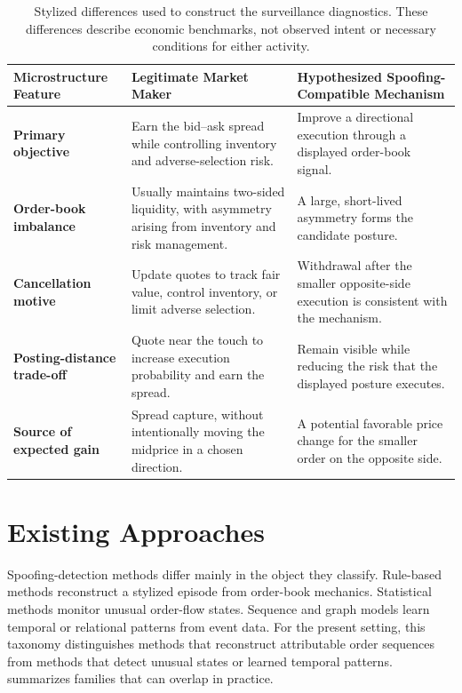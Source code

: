 \documentclass[11pt]{article}
\begin{document}
\begin{table}[htbp]
\centering
\caption{Stylized differences used to construct the surveillance diagnostics. These differences describe economic
benchmarks, not observed intent or necessary conditions for either activity.}
\label{tab:surveillance-models}
\renewcommand{\arraystretch}{1.4}
\setlength{\tabcolsep}{8pt}

\begin{tabularx}{\textwidth}{
    >{\raggedright\arraybackslash\bfseries}p{}
    >{\raggedright\arraybackslash}X
    >{\raggedright\arraybackslash}X
}
\toprule
\rowcolor{gray!15}
\textbf{Microstructure Feature} & \textbf{Legitimate Market Maker} & \textbf{Hypothesized Spoofing-Compatible Mechanism} \\
\midrule
Primary objective
& Earn the bid--ask spread while controlling inventory and adverse-selection risk.
& Improve a directional execution through a displayed order-book signal. \\

Order-book imbalance
& Usually maintains two-sided liquidity, with asymmetry arising from inventory and risk management.
& A large, short-lived asymmetry forms the candidate posture. \\

Cancellation motive
& Update quotes to track fair value, control inventory, or limit adverse selection.
& Withdrawal after the smaller opposite-side execution is consistent with the mechanism. \\

Posting-distance trade-off
& Quote near the touch to increase execution probability and earn the spread.
& Remain visible while reducing the risk that the displayed posture executes. \\

Source of expected gain
& Spread capture, without intentionally moving the midprice in a chosen direction.
& A potential favorable price change for the smaller order on the opposite side. \\
\bottomrule
\end{tabularx}
\end{table}

\section{Existing Approaches}
\label{sec:existing_approaches}
Spoofing-detection methods differ mainly in the object they classify. Rule-based methods reconstruct a stylized episode
from order-book mechanics. Statistical methods monitor unusual order-flow states. Sequence and graph models learn temporal
or relational patterns from event data. For the present setting, this taxonomy distinguishes methods that reconstruct
attributable order sequences from methods that detect unusual states or learned temporal patterns.
 summarizes families that can overlap in practice.
\end{document}
